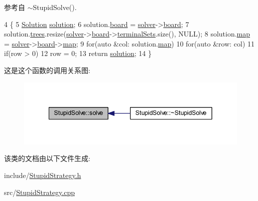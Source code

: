 参考自 $\sim$\+Stupid\+Solve().


\begin{DoxyCode}
4 \{
5     \hyperlink{classSolution}{Solution} \hyperlink{classes_8txt_aa43d5190bbc491d9c9134146e01a248e}{solution};
6     solution.\hyperlink{classSolution_ac4f88cd3aa0713e8900f33eb9f1f15bf}{board} = \hyperlink{classSolveStrategy_a94d43c47305176d0d3858697d3410443}{solver}->\hyperlink{classSolver_a8966a22c2f247addc8ce453d119bc54e}{board};
7     solution.\hyperlink{classSolution_a554205b5c578add14d2d7836042215d8}{trees}.resize(\hyperlink{classSolveStrategy_a94d43c47305176d0d3858697d3410443}{solver}->\hyperlink{classSolver_a8966a22c2f247addc8ce453d119bc54e}{board}->\hyperlink{classBoard_a6683a9c042af7113f55c5bc1b9656b69}{terminalSets}.size(), NULL);
8     solution.\hyperlink{classSolution_ae89ccd74484f2c87afa05b16f8ee5bf6}{map} = \hyperlink{classSolveStrategy_a94d43c47305176d0d3858697d3410443}{solver}->\hyperlink{classSolver_a8966a22c2f247addc8ce453d119bc54e}{board}->\hyperlink{classBoard_a191ff45df9151b8fee0c32877f582165}{map};
9     \textcolor{keywordflow}{for}(\textcolor{keyword}{auto} &col: solution.\hyperlink{classSolution_ae89ccd74484f2c87afa05b16f8ee5bf6}{map})
10         \textcolor{keywordflow}{for}(\textcolor{keyword}{auto} &row: col)
11             \textcolor{keywordflow}{if}(row > 0)
12                 row = 0;
13     \textcolor{keywordflow}{return} \hyperlink{classes_8txt_aa43d5190bbc491d9c9134146e01a248e}{solution};
14 \}
\end{DoxyCode}


这是这个函数的调用关系图\+:
\nopagebreak
\begin{figure}[H]
\begin{center}
\leavevmode
\includegraphics[width=342pt]{classStupidSolve_aee240779acb1983c0fba3dfc6bec643f_icgraph}
\end{center}
\end{figure}




该类的文档由以下文件生成\+:\begin{DoxyCompactItemize}
\item 
include/\hyperlink{StupidStrategy_8h}{Stupid\+Strategy.\+h}\item 
src/\hyperlink{StupidStrategy_8cpp}{Stupid\+Strategy.\+cpp}\end{DoxyCompactItemize}
